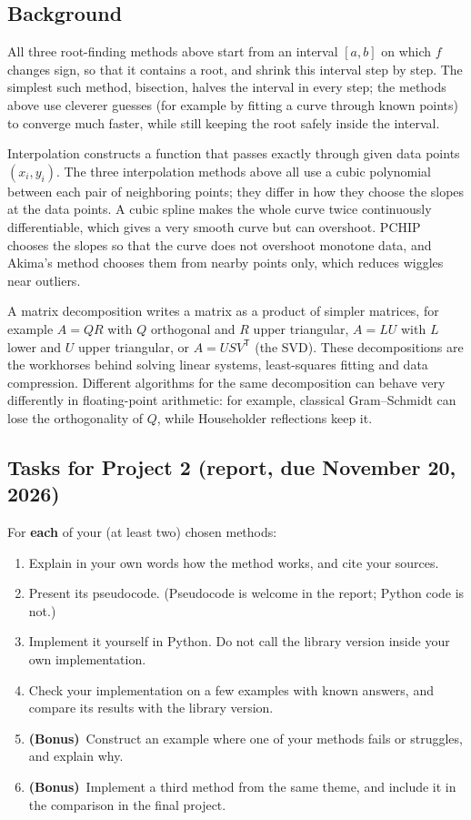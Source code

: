 \documentclass[11pt,a4paper]{article}
\newcommand{\bonus}{\textbf{(Bonus)}}
\begin{document}
\subsection*{Background}
All three root-finding methods above start from an interval $[a, b]$ on which
$f$ changes sign, so that it contains a root, and shrink this interval step
by step. The simplest such method, bisection, halves the interval in every
step; the methods above use cleverer guesses (for example by fitting a
curve through known points) to converge much faster, while still keeping the
root safely inside the interval.

Interpolation constructs a function that passes exactly through given data
points $(x_i, y_i)$. The three interpolation methods above all use a cubic
polynomial between each pair of neighboring points; they differ in how they
choose the slopes at the data points. A cubic spline makes the whole curve
twice continuously differentiable, which gives a very smooth curve but can
overshoot. PCHIP chooses the slopes so that the curve does not overshoot
monotone data, and Akima's method chooses them from nearby points only, which
reduces wiggles near outliers.

A matrix decomposition writes a matrix as a product of simpler matrices,
for example $A = QR$ with $Q$ orthogonal and $R$ upper triangular, $A = LU$
with $L$ lower and $U$ upper triangular, or $A = U S V^{\mathsf{T}}$ (the
SVD). These decompositions are the workhorses behind solving linear systems,
least-squares fitting and data compression. Different algorithms for the
same decomposition can behave very differently in floating-point arithmetic:
for example, classical Gram--Schmidt can lose the orthogonality of $Q$,
while Householder reflections keep it.

\subsection*{Tasks for Project 2 (report, due November 20, 2026)}
For \textbf{each} of your (at least two) chosen methods:
\begin{enumerate}
  \item Explain in your own words how the method works, and cite your
        sources.
  \item Present its pseudocode. (Pseudocode is welcome in the report;
        Python code is not.)
  \item Implement it yourself in Python. Do not call the library version
        inside your own implementation.
  \item Check your implementation on a few examples with known answers, and
        compare its results with the library version.
  \item \bonus\ Construct an example where one of your methods fails or
        struggles, and explain why.
  \item \bonus\ Implement a third method from the same theme, and include it
        in the comparison in the final project.
\end{enumerate}
\end{document}
